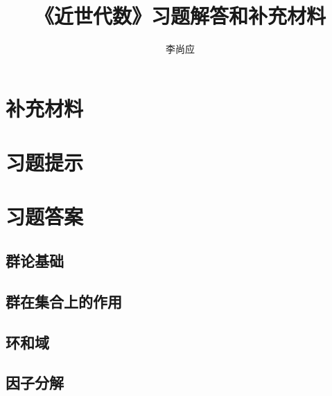 \documentclass{ctexbook}
\title{《近世代数》习题解答和补充材料}
\author{李尚应}
\begin{document}
	\maketitle
	\tableofcontents
	\part*{}
	
	
	
	
	\part{补充材料}
	\setcounter{chapter}{0}
	
	\setcounter{chapter}{7}
	
	\part{习题提示}
	\part{习题答案}
	\setcounter{chapter}{0}
	\chapter{群论基础}
		
		
		
		
	\chapter{群在集合上的作用}
		
		
		
		
		
		
	\chapter{环和域}
		
		
		
		
	\chapter{因子分解}
		
		
		
\end{document}
